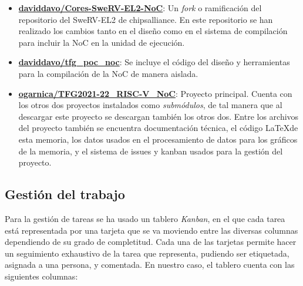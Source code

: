 \begin{itemize}
    \item \textbf{\href{https://github.com/daviddavo/Cores-SweRV-EL2-NoC}{daviddavo/Cores-SweRV-EL2-NoC}}: Un \textit{fork} o ramificación del repositorio del SweRV-EL2 de chipsalliance. En este repositorio se han realizado los cambios tanto en el diseño como en el sistema de compilación para incluir la NoC en la unidad de ejecución.
    \item \textbf{\href{https://github.com/daviddavo/tfg_poc_noc}{daviddavo/tfg\_poc\_noc}}: Se incluye el código del diseño y herramientas para la compilación de la NoC de manera aislada.
    \item \textbf{\href{https://github.com/ogarnica/TFG2021-22_RISC-V_NoC}{ogarnica/TFG2021-22\_RISC-V\_NoC}}: Proyecto principal. Cuenta con los otros dos proyectos instalados como \textit{submódulos}, de tal manera que al descargar este proyecto se descargan también los otros dos. Entre los archivos del proyecto también se encuentra documentación técnica, el código \LaTeX  de esta memoria, los datos usados en el procesamiento de datos para los gráficos de la memoria, y el sistema de issues y kanban usados para la gestión del proyecto.
\end{itemize}

\subsection{Gestión del trabajo}

Para la gestión de tareas se ha usado un tablero \textit{Kanban}, en el que cada tarea está representada por una tarjeta que se va moviendo entre las diversas columnas dependiendo de su grado de completitud. Cada una de las tarjetas permite hacer un seguimiento exhaustivo de la tarea que representa, pudiendo ser etiquetada, asignada a una persona, y comentada. En nuestro caso, el tablero cuenta con las siguientes columnas:

